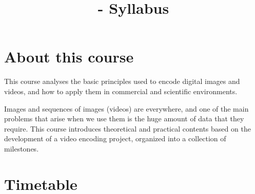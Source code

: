 
\title{\SM - Syllabus}

\maketitle

\section{About this course}

This course analyses the basic principles used to encode digital images
and videos, and how to apply them in commercial and scientific
environments.

Images and sequences of images (videos) are everywhere, and one of the
main problems that arise when we use them is the huge amount of data
that they require. This course introduces theoretical and practical
contents based on the development of a video encoding project,
organized into a collection of milestones.

\section{Timetable}

